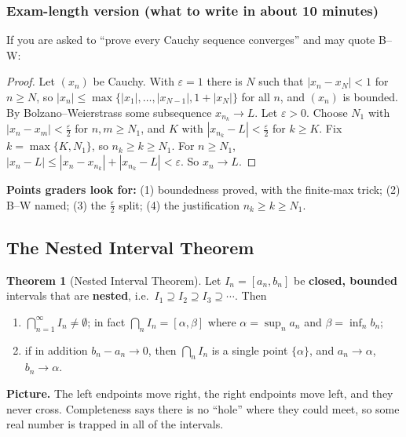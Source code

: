 \documentclass[11pt]{article}
\theoremstyle{definition}
\newtheorem{thm}[defn]{Theorem}
\newcommand{\eps}{\varepsilon}
\newcommand{\key}[1]{\textcolor{red!70!black}{\textbf{#1}}}
\begin{document}
\subsubsection*{Exam-length version (what to write in about 10 minutes)}
If you are asked to ``prove every Cauchy sequence converges'' and may
quote B--W:

\begin{proof}
Let $(x_n)$ be Cauchy. With $\eps=1$ there is $N$ such that $|x_n-x_N|<1$
for $n\ge N$, so $|x_n|\le\max\{|x_1|,\dots,|x_{N-1}|,1+|x_N|\}$ for all
$n$, and $(x_n)$ is bounded. By Bolzano--Weierstrass some subsequence
$x_{n_k}\to L$. Let $\eps>0$. Choose $N_1$ with $|x_n-x_m|<\frac\eps2$ for
$n,m\ge N_1$, and $K$ with $|x_{n_k}-L|<\frac\eps2$ for $k\ge K$. Fix
$k=\max\{K,N_1\}$, so $n_k\ge k\ge N_1$. For $n\ge N_1$,
$|x_n-L|\le|x_n-x_{n_k}|+|x_{n_k}-L|<\eps$. So $x_n\to L$.
\end{proof}

\noindent\key{Points graders look for:} (1) boundedness proved, with the
finite-max trick; (2) B--W named; (3) the $\frac\eps2$ split; (4) the
justification $n_k\ge k\ge N_1$.

\subsection{The Nested Interval Theorem}
\label{sec:nit}

\begin{thm}[Nested Interval Theorem]\label{thm:nit}
Let $I_n=[a_n,b_n]$ be \textbf{closed, bounded} intervals that are
\textbf{nested}, i.e.\ $I_1\supseteq I_2\supseteq I_3\supseteq\cdots$.
Then
\begin{enumerate}[label=(\alph*),nosep]
  \item $\displaystyle\bigcap_{n=1}^\infty I_n\neq\emptyset$; in fact
        $\bigcap_n I_n=[\alpha,\beta]$ where $\alpha=\sup_n a_n$ and
        $\beta=\inf_n b_n$;
  \item if in addition $b_n-a_n\to0$, then $\bigcap_n I_n$ is a single
        point $\{\alpha\}$, and $a_n\to\alpha$, $b_n\to\alpha$.
\end{enumerate}
\end{thm}

\noindent\key{Picture.} The left endpoints move right, the right endpoints
move left, and they never cross. Completeness says there is no ``hole''
where they could meet, so some real number is trapped in all of the
intervals.
\end{document}
